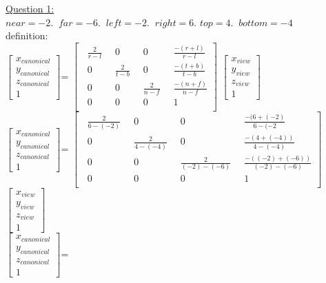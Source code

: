 \documentclass[12pt]{article}\usepackage{amsmath}
\begin{document}
\author{Joel Anna<annajoel@pdx.edu>}
\noindent
\underline{Question 1:}\\
$near = -2. \;\; far = -6. \;\; left = -2. \;\; right = 6.$
$top = 4. \;\; bottom = -4$\\
definition:\\
$\begin{bmatrix}
x_{canonical}\\
y_{canonical}\\
z_{canonical}\\
1
\end{bmatrix}$=
$\begin{bmatrix}
\;\; \frac{2}{r-l}&\;\; 0&\;\; 0&\;\; \frac{-(r+l)}{r-l}\\
\;\; 0 &\;\; \frac{2}{t-b}&\;\; 0&\;\; \frac{-(t+b)}{t-b}\\
\;\; 0&\;\; 0 &\;\; \frac{2}{n-f}&\;\; \frac{-(n+f)}{n-f}\\
 \;\;0&\;\; 0&\;\; 0&\;\; 1\\
\end{bmatrix}$
$\begin{bmatrix}
x_{view}\\
y_{view}\\
z_{view}\\
1
\end{bmatrix}$\\
$\begin{bmatrix}
x_{canonical}\\
y_{canonical}\\
z_{canonical}\\
1
\end{bmatrix}$=
$\begin{bmatrix}
\;\; \frac{2}{6-(-2)}&\;\; 0&\;\; 0&\;\; \frac{-(6+(-2)}{6-(-2}\\
\;\; 0 &\;\; \frac{2}{4-(-4)}&\;\; 0&\;\; \frac{-(4+(-4))}{4-(-4)}\\
\;\; 0&\;\; 0 &\;\; \frac{2}{(-2)-(-6)}&\;\; \frac{-((-2)+(-6))}{(-2)-(-6)}\\
 \;\;0&\;\; 0&\;\; 0&\;\; 1\\
\end{bmatrix}$
$\begin{bmatrix}
x_{view}\\
y_{view}\\
z_{view}\\
1
\end{bmatrix}$\\
$\begin{bmatrix}
x_{canonical}\\
y_{canonical}\\
z_{canonical}\\
1
\end{bmatrix}$=
\end{document}
